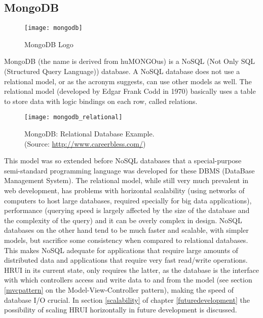 \subsection{MongoDB} \label{mongodb}
\begin{figure}[H]
  \captionsetup{justification=centering}
  \begin{center}
    \texttt{[image: mongodb]}
  \end{center}
  \caption{MongoDB Logo}
\end{figure}
MongoDB (the name is derived from huMONGOus) is a NoSQL (Not Only SQL (Structured Query Language)) database. A NoSQL database does not
use a relational model, or as the acronym suggests, can use other models as well. The relational model (developed by Edgar Frank Codd in
1970) basically uses a table to store data with logic bindings on each row, called relations.
\begin{figure}[H]
  \captionsetup{justification=centering}
  \begin{center}
    \texttt{[image: mongodb\_relational]}
  \end{center}
  \caption{MongoDB: Relational Database Example.\\(Source: \url{http://www.careerbless.com/})}
\end{figure}
This model was so extended before NoSQL databases that a special-purpose semi-standard programming language was developed for these DBMS
(DataBase Management System). The relational model, while still very much prevalent in web development, has problems with horizontal
scalability (using networks of computers to host large databases, required specially for big data applications), performance (querying
speed is largely affected by the size of the database and the complexity of the query) and it can be overly complex in design. NoSQL
databases on the other hand tend to be much faster and scalable, with simpler models, but sacrifice some consistency when compared to
relational databases. This makes NoSQL adequate for applications that require large amounts of distributed data and applications that
require very fast read/write operations. HRUI in its current state, only requires the latter, as the database is the interface with
which controllers access and write data to and from the model (see section \ref{mvcpattern} on the Model-View-Controller pattern),
making the speed of database I/O crucial. In section \ref{scalability} of chapter \ref{futuredevelopment} the possibility of scaling
HRUI horizontally in future development is discussed.\\

